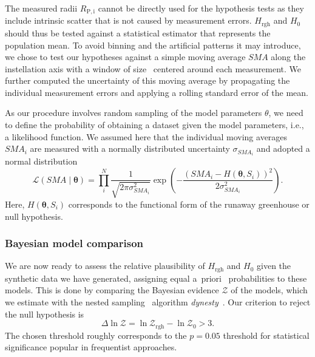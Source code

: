 \documentclass[twocolumn]{aastex631}
\begin{document}
The measured radii $R_\mathrm{P, i}$ cannot be directly used for the hypothesis tests as they include intrinsic scatter that is not caused by measurement errors.
$H_{\mathrm{rgh}}$ and $H_0$ should thus be tested against a statistical estimator that represents the population mean.
To avoid binning and the artificial patterns it may introduce, we chose to test our hypotheses against a simple moving average $SMA$ along the instellation axis with a window of size \windowsize\ centered around each measurement.
We further computed the uncertainty of this moving average by propagating the individual measurement errors and applying a rolling standard error of the mean. 

As our procedure involves random sampling of the model parameters $\theta$, we need to define the probability of obtaining a dataset given the model parameters, i.e., a likelihood function.
We assumed here that the individual moving averages $SMA_i$ are measured with a normally distributed uncertainty $\sigma_{SMA_i}$ and adopted a normal distribution
\begin{equation}
    \mathcal{L}(SMA \mid \boldsymbol{\theta})=\prod_{i}^{N} \frac{1}{\sqrt{2 \pi \sigma_{SMA_i}^{2}}} \exp \left(-\frac{\left(SMA_i - H\left(\boldsymbol{\theta}, S_i\right)\right)^{2}}{2 \sigma_{SMA_i}^{2}}\right).
\end{equation}
Here, $H\left(\boldsymbol{\theta}, S_i\right)$ corresponds to the functional form of the runaway greenhouse or null hypothesis.



\subsubsection{Bayesian model comparison}
We are now ready to assess the relative plausibility of $H_{\mathrm{rgh}}$ and $H_0$ given the synthetic data we have generated, assigning equal a~priori~ probabilities to these models.
This is done by comparing the Bayesian evidence $\mathcal{Z}$ of the models, which we estimate with the nested sampling~\citep{Skilling2004} algorithm \emph{dynesty}~\citep{Speagle2020}.
Our criterion to reject the null hypothesis is
\begin{equation}
\Delta \ln \mathcal{Z}  = \ln \mathcal{Z}_\mathrm{rgh} - \ln \mathcal{Z}_0  > 3.
\end{equation}
The chosen threshold roughly corresponds to the $p = 0.05$ threshold for statistical significance popular in frequentist approaches.
\end{document}
